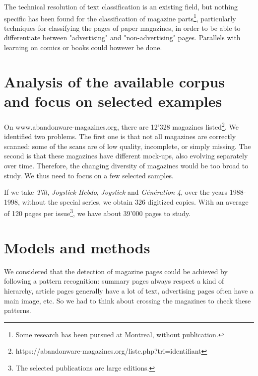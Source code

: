 \documentclass[10pt,conference,compsocconf]{IEEEtran}
\begin{document}
The technical resolution of text classification is an existing field, but nothing specific has been found for the classification of magazine parts\footnote{Some research has been pursued at Montreal, without publication.}, particularly techniques for classifying the pages of paper magazines, in order to be able to differentiate between "advertising" and "non-advertising" pages\footnotemark[1]. Parallels with learning on comics or books could however be done.

\section{Analysis of the available corpus and focus on selected examples}
On www.abandonware-magazines.org, there are 12'328 magazines listed\footnote{https://abandonware-magazines.org/liste.php?tri=identifiant}. We identified two problems. The first one is that not all magazines are correctly scanned: some of the scans are of low quality, incomplete, or simply missing. The second is that these magazines have different mock-ups, also evolving separately over time. Therefore, the changing diversity of magazines would be too broad to study. We thus need to focus on a few selected samples.

If we take \textit{Tilt}, \textit{Joystick Hebdo}, \textit{Joystick} and \textit{Génération 4}, over the years 1988-1998, without the special series, we obtain 326 digitized copies. With an average of 120 pages per issue\footnote{The selected publications are large editions.}, we have about 39'000 pages to study.

\section{Models and methods}
We considered that the detection of magazine pages could be achieved by following a pattern recognition: summary pages always respect a kind of hierarchy, article pages generally have a lot of text, advertising pages often have a main image, etc. So we had to think about crossing the magazines to check these patterns.
\end{document}
